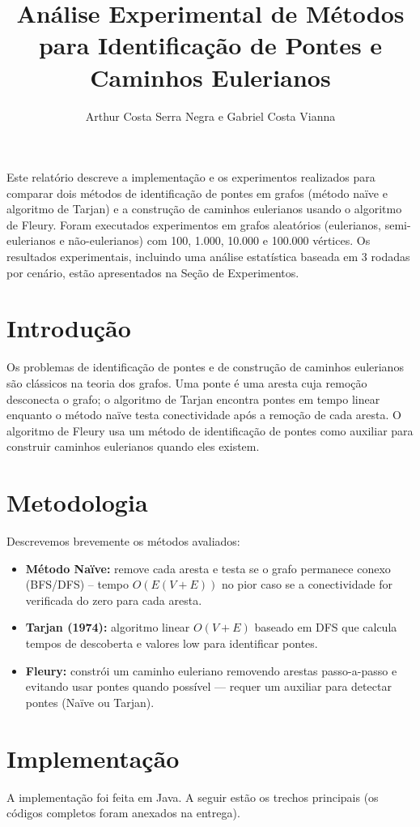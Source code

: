 \documentclass[12pt]{article}
\title{Análise Experimental de Métodos para Identificação de Pontes e Caminhos Eulerianos}
\author{Arthur Costa Serra Negra e Gabriel Costa Vianna\inst{1}}
\begin{document}
\maketitle

\begin{resumo}
Este relatório descreve a implementação e os experimentos realizados para comparar dois métodos de identificação de pontes em grafos (método naïve e algoritmo de Tarjan) e a construção de caminhos eulerianos usando o algoritmo de Fleury. Foram executados experimentos em grafos aleatórios (eulerianos, semi-eulerianos e não-eulerianos) com 100, 1.000, 10.000 e 100.000 vértices. Os resultados experimentais, incluindo uma análise estatística baseada em 3 rodadas por cenário, estão apresentados na Seção de Experimentos.
\end{resumo}

\section{Introdução}
Os problemas de identificação de pontes e de construção de caminhos eulerianos são clássicos na teoria dos grafos. Uma ponte é uma aresta cuja remoção desconecta o grafo; o algoritmo de Tarjan encontra pontes em tempo linear enquanto o método naïve testa conectividade após a remoção de cada aresta. O algoritmo de Fleury usa um método de identificação de pontes como auxiliar para construir caminhos eulerianos quando eles existem.

\section{Metodologia}
Descrevemos brevemente os métodos avaliados:
\begin{itemize}
 \item \textbf{Método Naïve:} remove cada aresta e testa se o grafo permanece conexo (BFS/DFS) -- tempo $O(E(V+E))$ no pior caso se a conectividade for verificada do zero para cada aresta.
 \item \textbf{Tarjan (1974):} algoritmo linear $O(V+E)$ baseado em DFS que calcula tempos de descoberta e valores low para identificar pontes.
 \item \textbf{Fleury:} constrói um caminho euleriano removendo arestas passo-a-passo e evitando usar pontes quando possível — requer um auxiliar para detectar pontes (Naïve ou Tarjan).
\end{itemize}

\section{Implementação}
A implementação foi feita em Java. A seguir estão os trechos principais (os códigos completos foram anexados na entrega).
\end{document}
